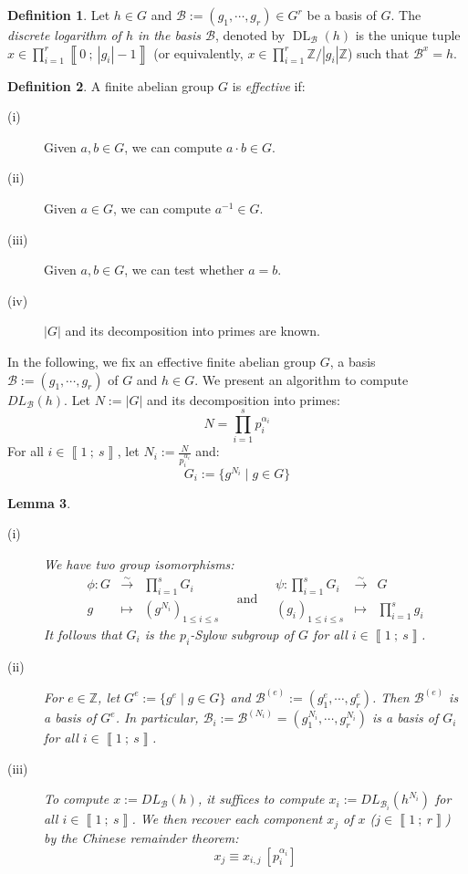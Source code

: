 \documentclass[a4paper,10pt]{report}
\theoremstyle{definition}
\newtheorem{definition}{Definition}[chapter]
\theoremstyle{plain}
\newtheorem{lemma}[definition]{Lemma}
\theoremstyle{definition}
\newcommand{\Z}{\mathbb{Z}}
\newcommand{\m}[1]{\mathcal{#1}}
\renewcommand{\i}[2]{\left\llbracket #1~;~#2\right\rrbracket}
\renewcommand{\(}{\left(}
\renewcommand{\)}{\right)}
\DeclareMathOperator{\DL}{DL}
\begin{document}
\begin{definition}\label{definition 5}
Let $h\in G$ and $\m{B}:=(g_1,\cdots, g_r)\in G^r$ be a basis of $G$. The \emph{discrete logarithm of $h$ in the basis $\m{B}$}, denoted by $\DL_{\m{B}}(h)$ is the unique tuple $x\in\prod_{i=1}^r\i{0}{|g_i|-1}$ (or equivalently, $x\in\prod_{i=1}^r\Z/|g_i|\Z$)  such that $\m{B}^x=h$. 
\end{definition}

\begin{definition}
A finite abelian group $G$ is \emph{effective} if: 
\begin{description}
\item[(i)] Given $a, b\in G$, we can compute $a\cdot b\in G$.
\item[(ii)] Given $a\in G$, we can compute $a^{-1}\in G$.
\item[(iii)] Given $a, b\in G$, we can test whether $a=b$.
\item[(iv)] $|G|$ and its decomposition into primes are known.
\end{description}
\end{definition}

In the following, we fix an effective finite abelian group $G$, a basis $\m{B}:=(g_1,\cdots, g_r)$ of $G$ and $h\in G$. We present an algorithm to compute $DL_{\m{B}}(h)$. Let $N:=|G|$ and its decomposition into primes:
\[N=\prod_{i=1}^s p_i^{\alpha_i}\]
For  all $i\in\i{1}{s}$, let $N_i:=\frac{N}{p_i^{\alpha_i}}$ and:
\[G_i:=\{g^{N_i}\mid g\in G\}\]

\begin{lemma}\label{lemma 11}
\begin{description}
\item[(i)] We have two group isomorphisms:
\[\begin{array}{rcl}
\phi : G&\overset{\sim}{\longrightarrow}&\prod_{i=1}^s G_i\\
g&\longmapsto & (g^{N_i})_{1\leq i\leq s}
\end{array} \quad \mbox{and} \quad \begin{array}{rcl}
\psi : \prod_{i=1}^s G_i &\overset{\sim}{\longrightarrow}& G\\
(g_i)_{1\leq i\leq s} &\longmapsto & \prod_{i=1}^s g_i
\end{array}\]
It follows that $G_i$ is the $p_i$-Sylow subgroup of $G$ for all $i\in\i{1}{s}$.

\item[(ii)] For $e\in\Z$, let $G^e:=\{g^e\mid g\in G\}$ and $\m{B}^{(e)}:=(g_1^e, \cdots, g_r^e)$. Then $\m{B}^{(e)}$ is a basis of $G^e$.  In particular, $\m{B}_i:=\m{B}^{(N_i)}=(g_1^{N_i},\cdots, g_r^{N_i})$ is a basis of $G_i$ for all $i\in\i{1}{s}$.

\item[(iii)] To compute $x:=DL_{\m{B}}(h)$, it suffices to compute $x_i:=DL_{\m{B}_i}(h^{N_i})$ for all $i\in\i{1}{s}$. We then recover each component $x_j$ of $x$ ($j\in\i{1}{r}$) by the Chinese remainder theorem:
\[x_j\equiv x_{i, j} \ [p_i^{\alpha_i}]\]
\end{description}
\end{lemma}
\end{document}
